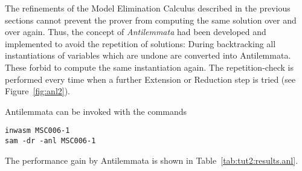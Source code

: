 %
%
%
%

The refinements of the Model Elimination Calculus described in the
previous sections cannot prevent the prover from computing the
same solution over and over again. Thus, the concept of
{\em Antilemmata\/} had been developed and implemented to
avoid the repetition of solutions: 
During backtracking all instantiations of variables which are undone
are converted into
Antilemmata. These forbid to compute the same instantiation again.
The repetition-check is performed every time when a further
Extension or Reduction step is tried (see Figure~\ref{fig:anl2}). 



Antilemmata can be invoked with the commands
\begin{center}
\begin{verbatim}
inwasm MSC006-1
sam -dr -anl MSC006-1
\end{verbatim}
\end{center}
The performance gain by Antilemmata is shown in
Table~\ref{tab:tut2:results.anl}. 

